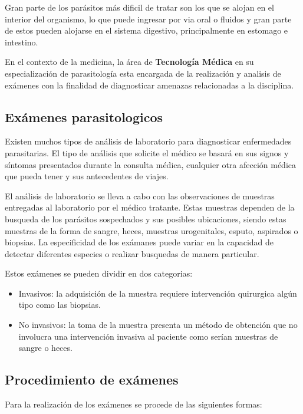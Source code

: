 \documentclass[letter,12pt]{report}
\begin{document}
Gran parte de los parásitos más dificil de tratar son los que se alojan en el
interior del organismo, lo que puede ingresar por via oral o fluidos y gran parte de
estos pueden alojarse en el sistema digestivo, principalmente en estomago e
intestino\cite{Vigil}.

En el contexto de la medicina, la área de \textbf{Tecnología Médica} en su
especialización de parasitología esta encargada de la realización y analisis de
exámenes con la finalidad de diagnosticar amenazas relacionadas a la
disciplina\cite{Digest}.

\subsection{Exámenes parasitologicos}

Existen muchos tipos de análisis de laboratorio para diagnosticar enfermedades parasitarias.
El tipo de análisis que solicite el médico se basará en sus signos y síntomas presentados
durante la consulta médica, cualquier otra afección médica que pueda tener y sus
antecedentes de viajes.

El análisis de laboratorio se lleva a cabo con las observaciones de muestras entregadas
al laboratorio por el médico tratante. Estas muestras dependen de la busqueda de los
parásitos sospechados y sus posibles ubicaciones, siendo estas muestras de la forma de
sangre, heces, muestras urogenitales, esputo, aspirados o biopsias. La especificidad de
los exámanes puede variar en la capacidad de detectar diferentes especies o realizar
busquedas de manera particular\cite{Util}.

Estos exámenes se pueden dividir en dos categorias:

\begin{itemize}
    \item Invasivos: la adquisición de la muestra requiere intervención
        quirurgica algún tipo como las biopsias.
    \item No invasivos: la toma de la muestra presenta un método de obtención que no
        involucra una intervención invasiva al paciente como serían muestras de sangre o
        heces.
\end{itemize}

\subsection{Procedimiento de exámenes}

Para la realización de los exámenes se procede de las siguientes formas: \cite{Diagnost}
\end{document}
